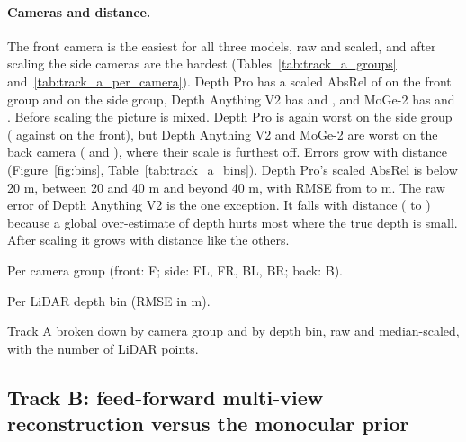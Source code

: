 \documentclass[10pt]{article}
\begin{document}
\paragraph{Cameras and distance.}
The front camera is the easiest for all three models, raw and scaled, and after scaling the side cameras
are the hardest (Tables~\ref{tab:track_a_groups} and~\ref{tab:track_a_per_camera}). Depth Pro has a scaled
AbsRel of \DPabsrelFrontScaled{} on the front group and \DPabsrelSideScaled{} on the side group, Depth
Anything V2 has \DAVabsrelFrontScaled{} and \DAVabsrelSideScaled{}, and MoGe-2 has \MOGEabsrelFrontScaled{}
and \MOGEabsrelSideScaled. Before scaling the picture is mixed. Depth Pro is again worst on the side group
(\DPabsrelSideRaw{} against \DPabsrelFrontRaw{} on the front), but Depth Anything V2 and MoGe-2 are worst
on the back camera (\DAVabsrelBackRaw{} and \MOGEabsrelBackRaw), where their scale is furthest off. Errors
grow with distance (Figure~\ref{fig:bins}, Table~\ref{tab:track_a_bins}). Depth Pro's scaled AbsRel is
\DPabsrelNearScaled{} below 20 m, \DPabsrelMidScaled{} between 20 and 40 m and \DPabsrelFarScaled{} beyond
40 m, with RMSE from \DPrmseNearScaled{} to \DPrmseFarScaled{} m. The raw error of Depth Anything V2 is the
one exception. It falls with distance (\DAVabsrelNearRaw{} to \DAVabsrelFarRaw) because a global
over-estimate of depth hurts most where the true depth is small. After scaling it grows with distance like
the others.

\begin{table}[t]
\centering
\begin{subtable}[t]{0.49\textwidth}
\centering
{}
\caption{Per camera group (front: F; side: FL, FR, BL, BR; back: B).}
\label{tab:track_a_groups}
\end{subtable}\hfill
\begin{subtable}[t]{0.49\textwidth}
\centering
{}
\caption{Per LiDAR depth bin (RMSE in m).}
\label{tab:track_a_bins}
\end{subtable}
\caption{Track A broken down by camera group and by depth bin, raw and median-scaled, with the number of LiDAR points.}
\label{tab:track_a_breakdown}
\end{table}

\subsection{Track B: feed-forward multi-view reconstruction versus the monocular prior}
\label{sec:track_b}
\end{document}
